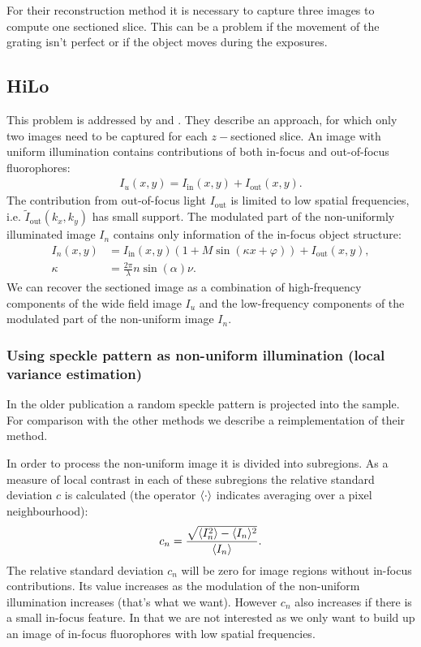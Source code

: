 For their reconstruction method it is necessary to capture three
images to compute one sectioned slice. This can be a problem if the
movement of the grating isn't perfect or if the object moves during
the exposures.
\subsection{HiLo}
This problem is addressed by \citet{2008Lim} and
\citet{2009Santos}. They describe an approach, for which only two
images need to be captured for each $z-$sectioned slice.  An image
with uniform illumination contains contributions of both in-focus and
out-of-focus fluorophores:
\begin{align}
\label{eqn:Iu}
  I_u(x,y)=I_\textrm{in}(x,y)+I_\textrm{out}(x,y).
\end{align}
The contribution from out-of-focus light $I_\textrm{out}$ is limited
to low spatial frequencies, i.e. $\tilde I_\textrm{out}(k_x,k_y)$ has
small support. The modulated part of the non-uniformly illuminated
image $I_n$ contains only information of the in-focus object
structure:
\begin{align}
\label{eqn:In}
  I_n(x,y)&=I_\textrm{in}(x,y)(1+M
  \sin(\kappa x+\varphi))+I_\textrm{out}(x,y),\\
  \kappa&=\frac{2\pi}{\lambda}n\sin(\alpha)\nu.
\end{align}
We can recover the sectioned image as a combination of high-frequency
components of the wide field image $I_u$ and the low-frequency
components of the modulated part of the non-uniform image $I_n$.
\subsubsection{Using speckle pattern as non-uniform illumination (local variance estimation)}
In the older publication \citep{2008Lim} a random speckle pattern is
projected into the sample. For comparison with the other methods we
describe a reimplementation of their method.

In order to process the non-uniform image it is divided into
subregions.  As a measure of local contrast in each of these
subregions the relative standard deviation $c$ is calculated (the
operator $\langle \cdot \rangle$ indicates averaging over a pixel
neighbourhood):
\begin{align}
  c_n=\frac{\sqrt{\langle I_n^2 \rangle-\langle I_n \rangle^2}}{\langle I_n \rangle}.
\end{align}
The relative standard deviation $c_n$ will be zero for image regions
without in-focus contributions. Its value increases as the modulation
of the non-uniform illumination increases (that's what we
want). However $c_n$ also increases if there is a small in-focus
feature. In that we are not interested as we only want to build up an
image of in-focus fluorophores with low spatial frequencies. 

